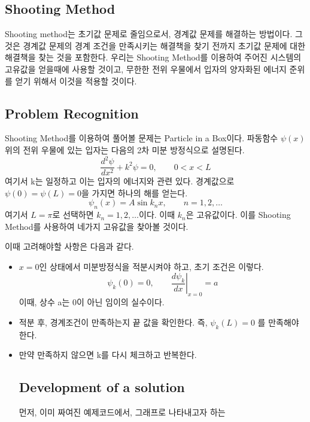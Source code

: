 \documentclass[11pt]{article}
\begin{document}
\subsection{Shooting Method} 
Shooting method는 초기값 문제로 줄임으로서, 경계값 문제를 해결하는 방법이다. 그것은 경계값 문제의 경계 조건을 만족시키는 해결책을 찾기 전까지 초기값 문제에 대한 해결책을 찾는 것을 포함한다. 우리는 Shooting Method를 이용하여 주어진 시스템의 고유값을 얻을때에 사용할 것이고, 무한한 전위 우물에서 입자의 양자화된 에너지 준위를 얻기 위해서 이것을 적용할 것이다.

\subsection{Problem Recognition} 
Shooting Method를 이용하여 풀어볼 문제는 Particle in a Box이다. 
파동함수 $\psi(x)$위의 전위 우물에 있는 입자는 다음의 2차 미분 방정식으로 설명된다.
\begin{equation}
\frac{d^2\psi}{dx^2} + k^2 \psi = 0
,\qquad 0 < x < L
\end{equation}
여기서 k는 일정하고 이는 입자의 에너지와 관련 있다. 경계값으로 $\psi(0) = \psi(L) = 0$을 가지면 하나의 해를 얻는다. 
\begin{equation}
\psi_n(x) = A \sin k_n x
,\qquad
n = 1, 2, \dots
\end{equation}
여기서 $L = \pi$로 선택하면  $k_n = 1, 2, \dots$이다. 이때 $k_n$은 고유값이다. 이를 Shooting Method를 사용하여 네가지 고유값을 찾아볼 것이다.

이때 고려해야할 사항은 다음과 같다.
\begin{itemize}
\item $x = 0$인 상태에서 미분방정식을 적분시켜야 하고, 초기 조건은 이렇다.
\begin{equation}
\psi_k(0) = 0
    ,\qquad
    \left.\frac{d\psi_k}{dx}\right|_{x = 0} = a
    \end{equation}
    이때, 상수 a는 0이 아닌 임이의 실수이다.
\item 적분 후, 경계조건이 만족하는지 끝 값을 확인한다. 즉, $\psi_k(L) = 0$ 를 만족해야 한다.
\item 만약 만족하지 않으면 k를 다시 체크하고 반복한다.

\subsection{Development of a solution} 
먼저, 이미 짜여진 예제코드에서, 그래프로 나타내고자 하는 


\end{itemize}
\end{document}
